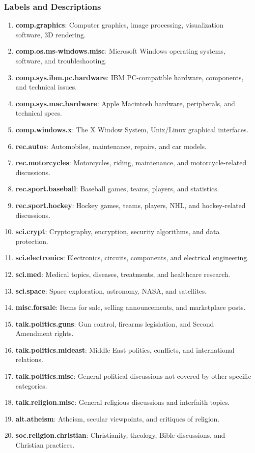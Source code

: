 \documentclass{article}
\begin{document}
\subsubsection{Labels and Descriptions}
\begin{enumerate}[label=\arabic*., leftmargin=*]
    \item \textbf{comp.graphics}: Computer graphics, image processing, visualization software, 3D rendering.
    \item \textbf{comp.os.ms-windows.misc}: Microsoft Windows operating systems, software, and troubleshooting.
    \item \textbf{comp.sys.ibm.pc.hardware}: IBM PC-compatible hardware, components, and technical issues.
    \item \textbf{comp.sys.mac.hardware}: Apple Macintosh hardware, peripherals, and technical specs.
    \item \textbf{comp.windows.x}: The X Window System, Unix/Linux graphical interfaces.
    \item \textbf{rec.autos}: Automobiles, maintenance, repairs, and car models.
    \item \textbf{rec.motorcycles}: Motorcycles, riding, maintenance, and motorcycle-related discussions.
    \item \textbf{rec.sport.baseball}: Baseball games, teams, players, and statistics.
    \item \textbf{rec.sport.hockey}: Hockey games, teams, players, NHL, and hockey-related discussions.
    \item \textbf{sci.crypt}: Cryptography, encryption, security algorithms, and data protection.
    \item \textbf{sci.electronics}: Electronics, circuits, components, and electrical engineering.
    \item \textbf{sci.med}: Medical topics, diseases, treatments, and healthcare research.
    \item \textbf{sci.space}: Space exploration, astronomy, NASA, and satellites.
    \item \textbf{misc.forsale}: Items for sale, selling announcements, and marketplace posts.
    \item \textbf{talk.politics.guns}: Gun control, firearms legislation, and Second Amendment rights.
    \item \textbf{talk.politics.mideast}: Middle East politics, conflicts, and international relations.
    \item \textbf{talk.politics.misc}: General political discussions not covered by other specific categories.
    \item \textbf{talk.religion.misc}: General religious discussions and interfaith topics.
    \item \textbf{alt.atheism}: Atheism, secular viewpoints, and critiques of religion.
    \item \textbf{soc.religion.christian}: Christianity, theology, Bible discussions, and Christian practices.
\end{enumerate}
\end{document}

